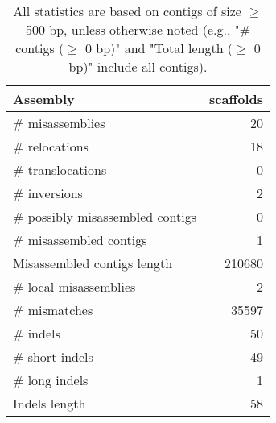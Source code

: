 \documentclass[12pt,a4paper]{article}
\begin{document}
\begin{table}[ht]
\begin{center}
\caption{All statistics are based on contigs of size $\geq$ 500 bp, unless otherwise noted (e.g., "\# contigs ($\geq$ 0 bp)" and "Total length ($\geq$ 0 bp)" include all contigs).}
\begin{tabular}{|l*{1}{|r}|}
\hline
Assembly & scaffolds \\ \hline
\# misassemblies & 20 \\ \hline
\hspace{5mm}\# relocations & 18 \\ \hline
\hspace{5mm}\# translocations & 0 \\ \hline
\hspace{5mm}\# inversions & 2 \\ \hline
\# possibly misassembled contigs & 0 \\ \hline
\# misassembled contigs & 1 \\ \hline
Misassembled contigs length & 210680 \\ \hline
\# local misassemblies & 2 \\ \hline
\# mismatches & 35597 \\ \hline
\# indels & 50 \\ \hline
\hspace{5mm}\# short indels & 49 \\ \hline
\hspace{5mm}\# long indels & 1 \\ \hline
Indels length & 58 \\ \hline
\end{tabular}
\end{center}
\end{table}
\end{document}
